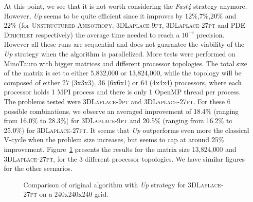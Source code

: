    At this point, we see that it is not worth considering the \emph{Fast4} strategy anymore. However, \emph{Up} seems to be
   quite efficient since it improves by $12\%$,$7\%$,$20\%$ and $22\%$ (for \textsc{Unstructured-Anisotropy}, \textsc{3DLaplace-9pt}, \textsc{3DLaplace-27pt} and \textsc{PDE-Dirichlet} respectively) the average time needed to reach
   a $10^{-i}$ precision.
   However all these runs are sequential and does not guarantee the viability of the \emph{Up} strategy when the algorithm is parallelized.
   More tests were performed on MinoTauro with bigger matrices and different processor topologies. The total size of the matrix is set to either
   5,832,000 or 13,824,000, while the topology will be composed of either 27 (3x3x3), 36 (6x6x1) or 64 (4x4x4) processors, where each processor holds 1 MPI process and there is only 1 OpenMP thread per process.
   The problems tested were \textsc{3DLaplace-9pt} and \textsc{3DLaplace-27pt}.
   For these 6 possible combinations, we observe an averaged improvement of 18.4\% (ranging from 16.0\% to 28.3\%) for \textsc{3DLaplace-9pt} and 20.5\% (ranging from 16.2\% to 25.0\%) for \textsc{3DLaplace-27pt}. It seems that \emph{Up} outperforms
   even more the classical V-cycle when the problem size increases, but seems to cap at around 25\% improvement. Figure~\ref{fig.mtup} presents the results for the matrix size 13,824,000 and \textsc{3DLaplace-27pt}, for the 3 different processor topologies. We have similar figures
   for the other scenarios.

   \begin{figure}[t]
    \caption{Comparison of original algorithm with \emph{Up} strategy for \textsc{3DLaplace-27pt} on a 240x240x240 grid.}
    \label{fig.mtup}
   \end{figure}
